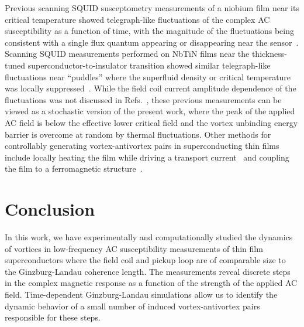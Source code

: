 \documentclass[%
 reprint,
 superscriptaddress,
 amsmath,
 amssymb,
 amsfonts,
 aps,
 prb,
]{revtex4-2}
\begin{document}
Previous scanning SQUID susceptometry measurements of a niobium film near its critical temperature showed telegraph-like fluctuations of the complex AC susceptibility as a function of time, with the magnitude of the fluctuations being consistent with a single flux quantum appearing or disappearing near the sensor~\cite{Wissberg2018-lq}. Scanning SQUID measurements performed on NbTiN films near the thickness-tuned superconductor-to-insulator transition showed similar telegraph-like fluctuations near ``puddles'' where the superfluid density or critical temperature was locally suppressed~\cite{Kremen2018-dp}. While the field coil current amplitude dependence of the fluctuations was not discussed in Refs.~\cite{Wissberg2018-lq, Kremen2018-dp}, these previous measurements can be viewed as a stochastic version of the present work, where the peak of the applied AC field is below the effective lower critical field and the vortex unbinding energy barrier is overcome at random by thermal fluctuations. Other methods for controllably generating vortex-antivortex pairs in superconducting thin films include locally heating the film while driving a transport current~\cite{Ge2017-wa} and coupling the film to a ferromagnetic structure~\cite{Gladilin2009-zl, Simmendinger2020-pv}.



\section{Conclusion}
\label{sec:conclusion}

In this work, we have experimentally and computationally studied the dynamics of vortices in low-frequency AC susceptibility measurements of thin film superconductors where the field coil and pickup loop are of comparable size to the Ginzburg-Landau coherence length. The measurements reveal discrete steps in the complex magnetic response as a function of the strength of the applied AC field. Time-dependent Ginzburg-Landau simulations allow us to identify the dynamic behavior of a small number of induced vortex-antivortex pairs responsible for these steps.
\end{document}
